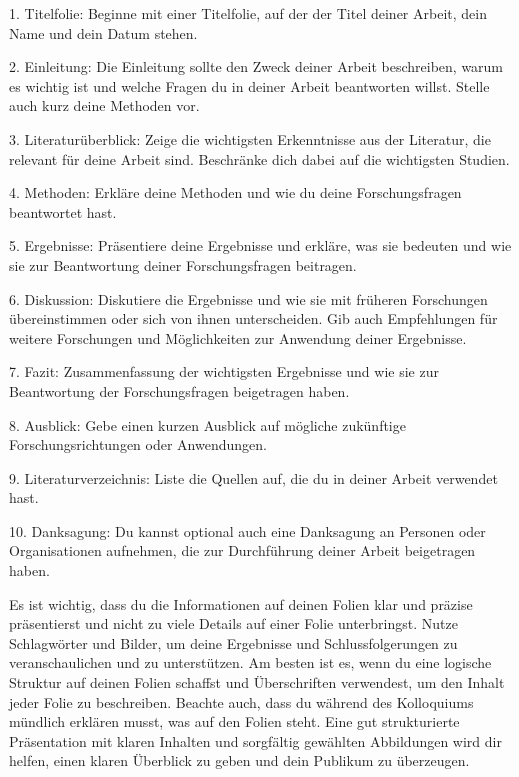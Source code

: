 1. Titelfolie: Beginne mit einer Titelfolie, auf der der Titel deiner Arbeit, dein Name und dein Datum stehen.

2. Einleitung: Die Einleitung sollte den Zweck deiner Arbeit beschreiben, warum es wichtig ist und welche Fragen du in deiner Arbeit beantworten willst. Stelle auch kurz deine Methoden vor.

3. Literaturüberblick: Zeige die wichtigsten Erkenntnisse aus der Literatur, die relevant für deine Arbeit sind. Beschränke dich dabei auf die wichtigsten Studien.

4. Methoden: Erkläre deine Methoden und wie du deine Forschungsfragen beantwortet hast.

5. Ergebnisse: Präsentiere deine Ergebnisse und erkläre, was sie bedeuten und wie sie zur Beantwortung deiner Forschungsfragen beitragen.

6. Diskussion: Diskutiere die Ergebnisse und wie sie mit früheren Forschungen übereinstimmen oder sich von ihnen unterscheiden. Gib auch Empfehlungen für weitere Forschungen und Möglichkeiten zur Anwendung deiner Ergebnisse.

7. Fazit: Zusammenfassung der wichtigsten Ergebnisse und wie sie zur Beantwortung der Forschungsfragen beigetragen haben.

8. Ausblick: Gebe einen kurzen Ausblick auf mögliche zukünftige Forschungsrichtungen oder Anwendungen.

9. Literaturverzeichnis: Liste die Quellen auf, die du in deiner Arbeit verwendet hast.

10. Danksagung: Du kannst optional auch eine Danksagung an Personen oder Organisationen aufnehmen, die zur Durchführung deiner Arbeit beigetragen haben.

Es ist wichtig, dass du die Informationen auf deinen Folien klar und präzise präsentierst und nicht zu viele Details auf einer Folie unterbringst. Nutze Schlagwörter und Bilder, um deine Ergebnisse und Schlussfolgerungen zu veranschaulichen und zu unterstützen. Am besten ist es, wenn du eine logische Struktur auf deinen Folien schaffst und Überschriften verwendest, um den Inhalt jeder Folie zu beschreiben. Beachte auch, dass du während des Kolloquiums mündlich erklären musst, was auf den Folien steht. Eine gut strukturierte Präsentation mit klaren Inhalten und sorgfältig gewählten Abbildungen wird dir helfen, einen klaren Überblick zu geben und dein Publikum zu überzeugen.